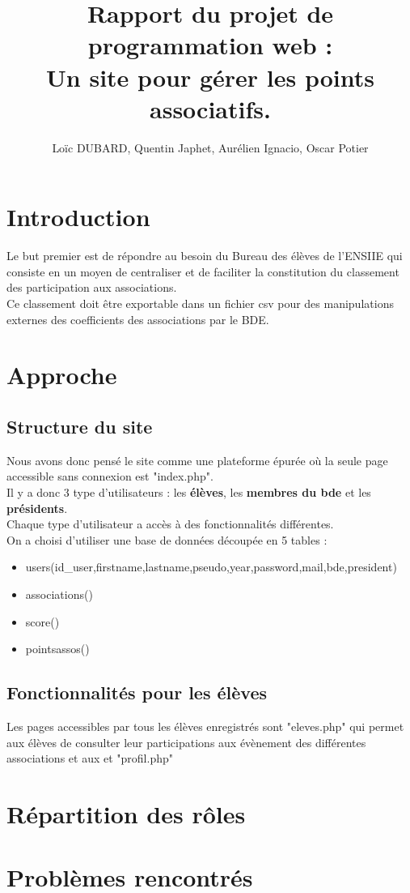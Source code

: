 \documentclass[french]{article}
\author{Loïc DUBARD, Quentin Japhet, Aurélien Ignacio, Oscar Potier}
\title{Rapport du projet de programmation web : \\
\textbf{Un site pour gérer les points associatifs}.}
\begin{document}
\maketitle
\tableofcontents
\clearpage
\section*{Introduction}
Le but premier est de répondre au besoin du Bureau des élèves de l'ENSIIE qui consiste en un moyen de centraliser et de faciliter la constitution du classement des participation aux associations.\\

 Ce classement doit être exportable dans un fichier csv pour des manipulations externes des coefficients des associations par le BDE.\\
 
\section{Approche}
\subsection{Structure du site}
Nous avons donc pensé le site comme une plateforme épurée où la seule page accessible sans connexion est "index.php".\\
 Il y a donc 3 type d'utilisateurs : les \textbf{élèves}, les \textbf{membres du bde} et les \textbf{présidents}.\\ Chaque type d'utilisateur a accès à des fonctionnalités différentes.\\ 
 
 On a choisi d'utiliser une base de données découpée en 5 tables : 
 \begin{itemize}
 	\item users(id\_user,firstname,lastname,pseudo,year,password,mail,bde,president)
 	\item associations()
 	\item score()
 	\item pointsassos()
 \end{itemize} 

\subsection{Fonctionnalités pour les élèves}
	Les pages accessibles par tous les élèves enregistrés sont "eleves.php" qui permet aux élèves de consulter leur participations aux évènement des différentes associations et aux et "profil.php"
\section{Répartition des rôles}
\section{Problèmes rencontrés}
\end{document}
